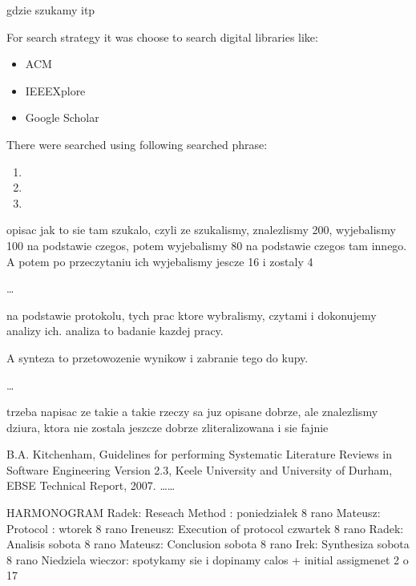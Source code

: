 \documentclass[times, 10pt,twocolumn]{article}
\begin{document}

gdzie szukamy itp

For search strategy it was choose to search digital libraries like:
\begin{itemize}
	\item ACM
	\item IEEEXplore
	\item Google Scholar
\end{itemize}

There were searched using following searched phrase:
\begin{enumerate}
	\item 
	\item
	\item
\end{enumerate}



opisac jak to sie tam szukalo, czyli ze szukalismy, znalezlismy 200,
wyjebalismy 100 na podstawie czegos, potem wyjebalismy 80 na podstawie 
czegos tam innego. A potem po przeczytaniu ich wyjebalismy jescze 16 i zostaly
4

\ldots



na podstawie protokolu, tych prac ktore wybralismy, czytami i dokonujemy analizy ich.
analiza to badanie kazdej pracy.


A synteza to przetowozenie wynikow i zabranie tego do kupy.

\ldots


trzeba napisac ze takie a takie rzeczy sa juz opisane dobrze, ale znalezlismy dziura, ktora
nie zostala jeszcze dobrze zliteralizowana i sie fajnie

\noindent [1] B.A. Kitchenham, Guidelines for performing Systematic Literature Reviews in Software Engineering Version 2.3, Keele University and University of Durham, EBSE Technical Report, 2007. \newline
[2] \ldots \newline
[3] \ldots

\nocite{ex1,ex2}
 

HARMONOGRAM
Radek: Reseach Method : poniedziałek 8 rano
Mateusz: Protocol : wtorek 8 rano
Ireneusz: Execution of protocol czwartek 8 rano
Radek: Analisis sobota 8 rano
Mateusz: Conclusion sobota 8 rano
Irek: Synthesiza sobota 8 rano
Niedziela wieczor: spotykamy sie i dopinamy calos + initial assigmenet 2 o 17
\end{document}
